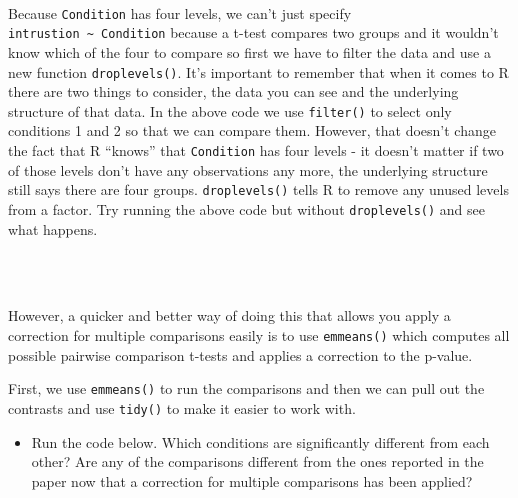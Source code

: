 \documentclass[]{book}
\newenvironment{Shaded}{\begin{snugshade}}{\end{snugshade}}
\newcommand{\DataTypeTok}[1]{\textcolor[rgb]{0.13,0.29,0.53}{#1}}
\newcommand{\KeywordTok}[1]{\textcolor[rgb]{0.13,0.29,0.53}{\textbf{#1}}}
\newcommand{\NormalTok}[1]{#1}
\newcommand{\OperatorTok}[1]{\textcolor[rgb]{0.81,0.36,0.00}{\textbf{#1}}}
\newcommand{\StringTok}[1]{\textcolor[rgb]{0.31,0.60,0.02}{#1}}
\providecommand{\tightlist}{%
  \setlength{\itemsep}{0pt}\setlength{\parskip}{0pt}}
\newenvironment{info}
    {
    \hline\\
    }
    { 
    \\\\\hline
    }
\begin{document}
\begin{info}
Because \texttt{Condition} has four levels, we can't just specify
\texttt{intrustion\ \textasciitilde{}\ Condition} because a t-test
compares two groups and it wouldn't know which of the four to compare so
first we have to filter the data and use a new function
\texttt{droplevels()}. It's important to remember that when it comes to
R there are two things to consider, the data you can see and the
underlying structure of that data. In the above code we use
\texttt{filter()} to select only conditions 1 and 2 so that we can
compare them. However, that doesn't change the fact that R ``knows''
that \texttt{Condition} has four levels - it doesn't matter if two of
those levels don't have any observations any more, the underlying
structure still says there are four groups. \texttt{droplevels()} tells
R to remove any unused levels from a factor. Try running the above code
but without \texttt{droplevels()} and see what happens.
\end{info}

However, a quicker and better way of doing this that allows you apply a correction for multiple comparisons easily is to use \texttt{emmeans()} which computes all possible pairwise comparison t-tests and applies a correction to the p-value.

First, we use \texttt{emmeans()} to run the comparisons and then we can pull out the contrasts and use \texttt{tidy()} to make it easier to work with.

\begin{itemize}
\tightlist
\item
  Run the code below. Which conditions are significantly different from each other? Are any of the comparisons different from the ones reported in the paper now that a correction for multiple comparisons has been applied?
\end{itemize}

\begin{Shaded}
\end{Shaded}
\end{document}
